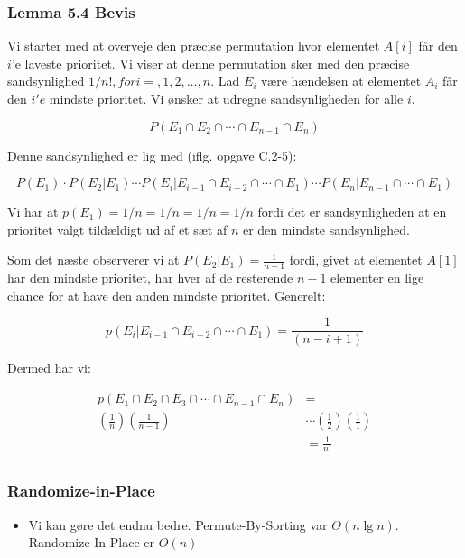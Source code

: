 \documentclass{beamer}
\begin{document}
\begin{frame}[allowframebreaks]
  \frametitle{Lemma 5.4 Bevis}
 Vi starter med at overveje den præcise permutation hvor elementet $A[i]$ får den $i$'e laveste prioritet. Vi viser at denne permutation sker med den præcise sandsynlighed $1/n!, for i =, 1, 2, \ldots, n$. Lad $E_{i}$ være hændelsen at elementet $A_{i}$ får den $i'e$ mindste prioritet. Vi ønsker at udregne sandsynligheden for alle $i$.

   \begin{equation*}
P(E_{1} \cap E_{2} \cap \cdots \cap E_{n-1} \cap E_{n})
   \end{equation*}

   Denne sandsynlighed er lig med (iflg. opgave C.2-5):

   \begin{equation*}
     P(E_{1}) \cdot P(E_{2}|E_{1}) 
     \cdots P(E_{i}| E_{i-1} \cap E_{i-2} \cap \cdots \cap E_{1}) \cdots P(E_{n}|E_{n-1} \cap \cdots \cap E_{1}) 
   \end{equation*}

   Vi har at $p(E_{1}) = 1/n = 1/n = 1/n = 1/n$ fordi det er sandsynligheden at en prioritet valgt tildældigt ud af et sæt af $n$ er den mindste sandsynlighed.

   Som det næste observerer vi at $P(E_2|E_{1}) = \frac{1}{n-1}$ fordi, givet at elementet $A[1]$ har den mindste prioritet, har hver af de resterende $n-1$ elementer en lige chance for at have den anden mindste prioritet. Generelt:

   \begin{equation*}
     p(E_{i} | E_{i-1} \cap E_{i-2} \cap \cdots \cap E_{1}) = \frac{1}{(n-i+1)}
   \end{equation*}

   Dermed har vi:

   \begin{equation*}
     \begin{split}
     p(E_{1} \cap E_{2} \cap E_{3} \cap \cdots \cap E_{n-1} \cap E_{n}) &=\\
     \left( \frac{1}{n} \right) \left( \frac{1}{n-1} \right) &\cdots \left( \frac{1}{2} \right) \left( \frac{1}{1} \right) \\
    &= \frac{1}{n!}\\
     \end{split}
   \end{equation*}
\end{frame}

\begin{frame}
  \frametitle{Randomize-in-Place}

  \begin{itemize}
  \item Vi kan gøre det endnu bedre. Permute-By-Sorting var $\Theta (n \lg n)$. Randomize-In-Place er $O(n)$
  \end{itemize}
\end{frame}
\end{document}
